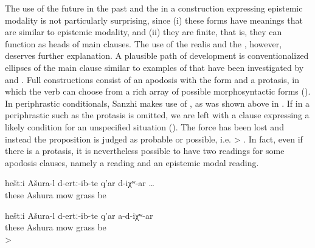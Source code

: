 The use of the future in the past and the  in a construction expressing epistemic modality is not particularly surprising, since (i) these forms have meanings that are similar to epistemic modality, and (ii) they are finite, that is, they can function as heads of main clauses. The use of the realis  and the , however, deserves further explanation. A plausible path of development is conventionalized ellipses of the main clause similar to examples of  that have been investigated by \citet{Evans2007} and \citet{EvansWatanabe2016}. Full  constructions consist of an apodosis with the  form and a protasis, in which the verb can choose from a rich array of possible morphosyntactic forms (). In periphrastic conditionals, Sanzhi makes use of , as was shown above in . If in a periphrastic  such as  the protasis is omitted, we are left with a clause expressing a likely condition for an unspecified situation (). The  force has been lost and instead the proposition is judged as probable or possible, i.e.  >  . In fact, even if there is a protasis, it is nevertheless possible to have two readings for some apodosis clauses, namely a  reading and an epistemic modal reading.
%
\begin{exe}
	\ex	\label{ex:Ashura mows the lawn}
	\begin{xlist}
		\ex	\label{ex:‎‎If Ashura has mowed this grass@A}
		\gll	heštːi	Ašura-l d-ertː-ib-te	q'ar	d-iχʷ-ar \ldots\\
			these	Ashura	mow 	grass be\\
		\glt	{}

		\ex	\label{ex:‎‎If Ashura has not mowed this grass@B}
		\gll	heštːi	Ašura-l d-ertː-ib-te	q'ar	a-d-iχʷ-ar \\
			these	Ashura	mow 	grass be\\
		\glt	{} > 
	\end{xlist}
\end{exe}

